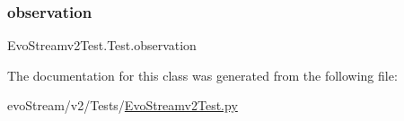 \mbox{\label{classEvoStreamv2Test_1_1Test_a4538c742103feb7803bd7f244ee8af05}} 
\subsubsection{\texorpdfstring{observation}{observation}}
{\footnotesize\ttfamily Evo\+Streamv2\+Test.\+Test.\+observation}



The documentation for this class was generated from the following file\+:\begin{DoxyCompactItemize}
\item 
evo\+Stream/v2/\+Tests/\hyperlink{EvoStreamv2Test_8py}{Evo\+Streamv2\+Test.\+py}\end{DoxyCompactItemize}
